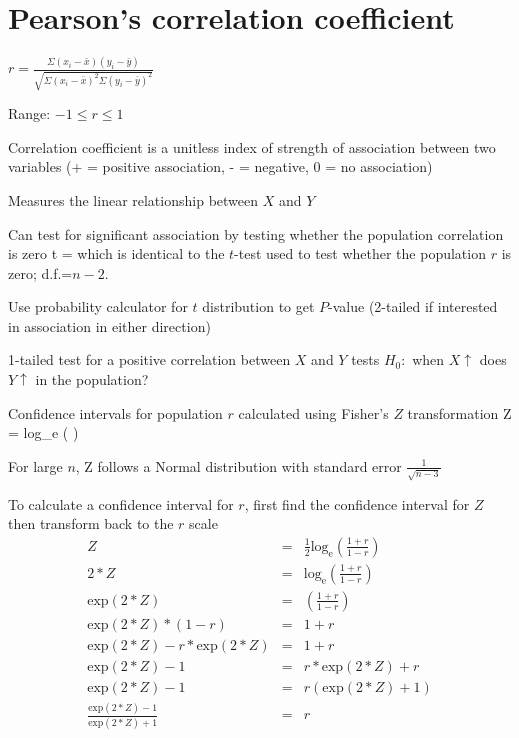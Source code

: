 \section{Pearson's correlation coefficient} 
\bi
\item $r = \frac{\Sigma(x_i - \bar{x})(y_i - \bar{y})}{\sqrt{\Sigma(x_i - \bar{x})^2\Sigma(y_i - \bar{y})^2}}$
\item Range: $-1 \leq r \leq 1$
\item Correlation coefficient is a unitless index of strength of association between two variables (+ = positive association, - = negative, 0 = no association)
\item Measures the linear relationship between $X$ and $Y$
\item Can test for significant association by testing whether the population correlation is zero
\beq
t = 
\eeq
which is identical to the $t$-test used to test whether the population
$r$ is zero; d.f.=$n-2$.
\item Use probability calculator for $t$ distribution to get $P$-value
  (2-tailed if interested in association in either direction)
\item 1-tailed test for a positive correlation between $X$ and $Y$
  tests $H_{0}:$ when $X \uparrow$ does $Y \uparrow$ in the population?
\item Confidence intervals for population $r$ calculated using
  Fisher's $Z$ transformation 
\beq
Z =  \textrm{log}_\textrm{e} \left(  \right)
\eeq
 \bi 
 \item For large $n$, Z follows a Normal distribution with standard error $\frac{1}{\sqrt{n-3}}$
 \item To calculate a confidence interval for $r$, first find the confidence interval for $Z$ then transform back to the $r$ scale
 \ei
\begin{eqnarray*}
 Z & = & \frac{1}{2} \textrm{log}_\textrm{e} \left( \frac{1+r}{1-r} \right) \\
 2*Z & = & \textrm{log}_\textrm{e} \left( \frac{1+r}{1-r} \right) \\
 \textrm{exp}(2*Z) & = & \left( \frac{1+r}{1-r} \right) \\
 \textrm{exp}(2*Z) * (1-r) & = & 1 + r \\
 \textrm{exp}(2*Z) - r * \textrm{exp}(2*Z) & = & 1 + r \\
 \textrm{exp}(2*Z) - 1 & = & r * \textrm{exp}(2*Z) + r \\
 \textrm{exp}(2*Z) - 1 & = & r \left(\textrm{exp}(2*Z) + 1\right) \\
 \frac{\textrm{exp}(2*Z) - 1}{\textrm{exp}(2*Z) + 1} & = & r \\
\end{eqnarray*}

